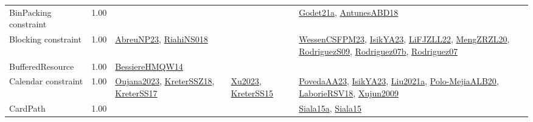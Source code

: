 {\begin{longtable}{p{3cm}r>{\raggedright\arraybackslash}p{6cm}>{\raggedright\arraybackslash}p{6cm}>{\raggedright\arraybackslash}p{8cm}}
\index{BinPacking constraint}\index{Constraints!BinPacking constraint}BinPacking constraint &  1.00 &  &  & \hyperref[detail:Godet21a]{Godet21a}, \hyperref[detail:AntunesABD18]{AntunesABD18}\\
\index{Blocking constraint}\index{Constraints!Blocking constraint}Blocking constraint &  1.00 & \hyperref[detail:AbreuNP23]{AbreuNP23}, \hyperref[detail:RiahiNS018]{RiahiNS018} &  & \hyperref[detail:WessenCSFPM23]{WessenCSFPM23}, \hyperref[detail:IsikYA23]{IsikYA23}, \hyperref[detail:LiFJZLL22]{LiFJZLL22}, \hyperref[detail:MengZRZL20]{MengZRZL20}, \hyperref[detail:RodriguezS09]{RodriguezS09}, \hyperref[detail:Rodriguez07b]{Rodriguez07b}, \hyperref[detail:Rodriguez07]{Rodriguez07}\\
\index{BufferedResource}\index{Constraints!BufferedResource}BufferedResource &  1.00 & \hyperref[detail:BessiereHMQW14]{BessiereHMQW14} &  & \\
\index{Calendar constraint}\index{Constraints!Calendar constraint}Calendar constraint &  1.00 & \hyperref[detail:Oujana2023]{Oujana2023}, \hyperref[detail:KreterSSZ18]{KreterSSZ18}, \hyperref[detail:KreterSS17]{KreterSS17} & \hyperref[detail:Xu2023]{Xu2023}, \hyperref[detail:KreterSS15]{KreterSS15} & \hyperref[detail:PovedaAA23]{PovedaAA23}, \hyperref[detail:IsikYA23]{IsikYA23}, \hyperref[detail:Liu2021a]{Liu2021a}, \hyperref[detail:Polo-MejiaALB20]{Polo-MejiaALB20}, \hyperref[detail:LaborieRSV18]{LaborieRSV18}, \hyperref[detail:Xujun2009]{Xujun2009}\\
\index{CardPath}\index{Constraints!CardPath}CardPath &  1.00 &  &  & \hyperref[detail:Siala15a]{Siala15a}, \hyperref[detail:Siala15]{Siala15}\\

\end{longtable}}
